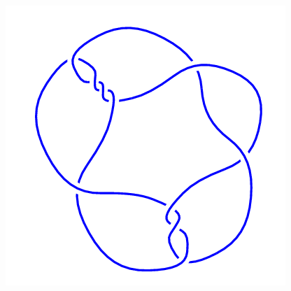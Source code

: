\begin{figure}[H]
\begin{minipage}[b]{.18\linewidth}
    \end{minipage}
    \begin{minipage}[b]{.18\linewidth}
        \centering
        \includegraphics[width=\linewidth]{../data/10_11.png}
    \end{minipage}
\end{figure}

